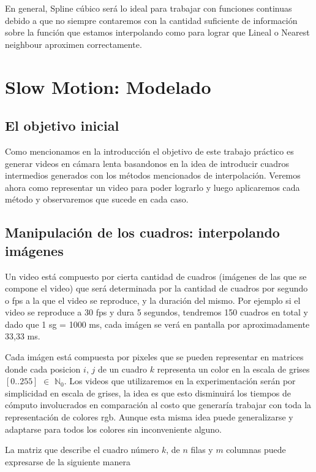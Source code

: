 En general, Spline cúbico será lo ideal para trabajar con funciones continuas debido a que no siempre contaremos con la cantidad suficiente de información sobre la función que estamos interpolando como para lograr que Lineal o Nearest neighbour aproximen correctamente. 

\section{Slow Motion: Modelado}

\subsection{El objetivo inicial}

Como mencionamos en la introducción el objetivo de este trabajo práctico es generar videos en cámara lenta basandonos en la idea de introducir cuadros intermedios generados con los métodos mencionados de interpolación. Veremos ahora como representar un video para poder lograrlo y luego aplicaremos cada método y observaremos que sucede en cada caso.

\subsection{Manipulación de los cuadros: interpolando imágenes}

Un video está compuesto por cierta cantidad de cuadros (imágenes de las que se compone el video) que será determinada por la cantidad de cuadros por segundo o fps a la que el video se reproduce, y la duración del mismo.
Por ejemplo si el video se reproduce a 30 fps y dura 5 segundos, tendremos 150 cuadros en total y dado que 1 sg = 1000 ms, cada imágen se verá en pantalla por aproximadamente 33,33 ms.

Cada imágen está compuesta por pixeles que se pueden representar en matrices donde cada posicion $i$, $j$ de un cuadro $k$ representa un color en la escala de grises $[0..255]$ $\in$ $\mathbb{N}_0$. Los videos que utilizaremos en la experimentación serán por simplicidad en escala de grises, la idea es que esto disminuirá los tiempos de cómputo involucrados en comparación al costo que generaría trabajar con toda la representación de colores rgb. Aunque esta misma idea puede generalizarse y adaptarse para todos los colores sin inconveniente alguno.

La matriz que describe el cuadro número $k$, de $n$ filas y $m$ columnas puede expresarse de la siguiente manera

